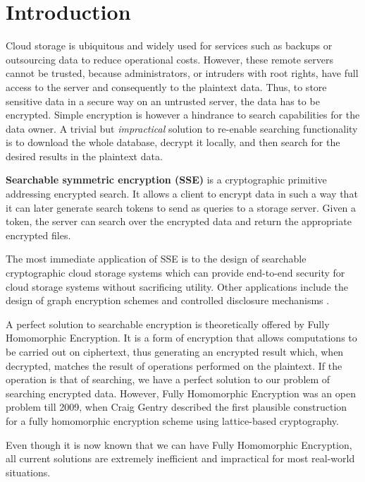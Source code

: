 \documentclass[12pt,a4paper]{article}
\theoremstyle{definition}
\begin{document}





\tableofcontents
\clearpage

\section{Introduction}

Cloud storage is ubiquitous and widely used for services such as backups or
outsourcing data to reduce operational costs. However, these remote servers
cannot be trusted, because administrators, or intruders with root rights, have
full access to the server and consequently to the plaintext data. Thus, to
store sensitive data in a secure way on an untrusted server, the data has to be
encrypted. Simple encryption is however a hindrance to search capabilities for
the data owner. A trivial but \emph{impractical} solution to re-enable
searching functionality is to download the whole database, decrypt it locally,
and then search for the desired results in the plaintext data.

\textbf{Searchable symmetric encryption (SSE)} is a cryptographic primitive
addressing encrypted search. It allows a client to encrypt data in such a
way that it can later generate search tokens to send as queries to a storage
server. Given a token, the server can search over the encrypted data and return
the appropriate encrypted files.

The most immediate application of SSE is to the design of searchable
cryptographic cloud storage systems which can provide end-to-end security
for cloud storage systems without sacrificing utility. Other applications
include the design of graph encryption schemes and controlled disclosure
mechanisms \cite{Kamara}.

A perfect solution to searchable encryption is theoretically offered by
Fully Homomorphic Encryption. It is a form of encryption that allows
computations to be carried out on ciphertext, thus generating an
encrypted result which, when decrypted, matches the result of
operations performed on the plaintext. If the operation is that of searching,
we have a perfect solution to our problem of searching encrypted data.
However, Fully Homomorphic Encryption was an open problem till 2009, when
Craig Gentry described the first plausible construction
for a fully homomorphic encryption scheme using lattice-based cryptography.

Even though it is now known that we can have Fully Homomorphic Encryption,
all current solutions are extremely inefficient and impractical
for most real-world situations.
\clearpage
\end{document}
